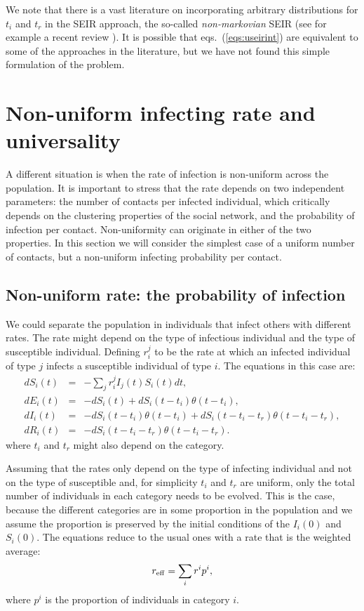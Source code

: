 \documentclass[a4paper,oneside,11pt]{article}
\begin{document}
We note that there is a vast literature on incorporating arbitrary distributions for $t_i$ and $t_r$ in the SEIR approach, the so-called 
{\it non-markovian} SEIR (see for example a recent review \cite{}). It is possible that eqs.~(\ref{eqs:useirint}) are equivalent to some of the approaches in the literature, but we have not found this simple formulation of the problem. 

\section{Non-uniform infecting rate and universality }
\label{sec:r}
A different situation is when the rate of infection is non-uniform across the population. It is important to stress that the rate depends on two independent parameters: the number of contacts per infected individual, which critically depends on the clustering properties of the social network,  and the probability of infection per contact. Non-uniformity can originate in either of the two properties. In this section we will consider the simplest case of a uniform number of contacts, but a non-uniform infecting probability per contact.

\subsection{Non-uniform rate: the probability of infection}
\label{sec:prob}

We could separate the population in individuals that infect others with different rates. The rate might depend on the type of infectious individual and the type of susceptible individual. Defining $r^{j}_{i}$ to be the rate at which an infected individual of type $j$ infects a susceptible individual of type $i$. The equations in this case are:
\begin{eqnarray}
d S_i(t) &=& - \sum_j r^j_{i}  I_j(t) S_i(t) dt, \nonumber\\
d E_i(t) &=& -d S_i(t) + d S_i(t-t_i) \theta(t-t_i) ,\nonumber\\
d I_i(t) &=& -d S_i(t-t_i) \theta(t-t_i)+ d S_i(t-t_i-t_r) \theta(t-t_i-t_r),\nonumber\\
d R_i(t) &=& - d S_i(t - t_i - t_r) \theta(t-t_i-t_r).\nonumber
\end{eqnarray}
where $t_i$ and $t_r$ might also depend on the category.

Assuming that the rates only depend on the type of infecting individual and not on the type of susceptible and, for simplicity $t_i$ and $t_r$ are uniform, only the total number of individuals in each category needs to be evolved. This is the case, because the different categories are in some proportion in the population and we assume the proportion is preserved by
 the initial conditions of the $I_i(0)$ and $S_i(0)$. The equations reduce to the usual ones with a rate that is the weighted average:
 \begin{eqnarray}
 r_{\rm eff} = \sum_i r^i p^i,
 \end{eqnarray}
 where $p^i$ is the proportion of individuals in category $i$.
\end{document}
